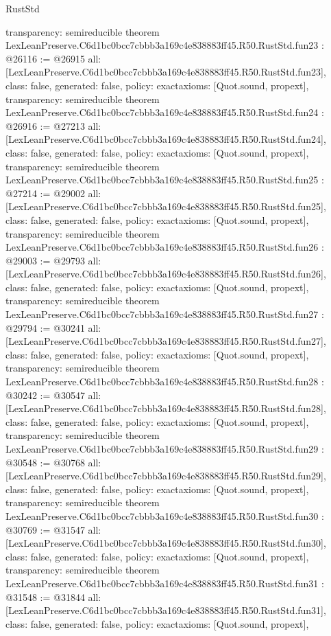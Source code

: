\begin{lexlean}{RustStd}
\begin{coremodule}
{  transparency: semireducible
}
theorem LexLeanPreserve.C6d1bc0bcc7cbbb3a169c4e838883ff45.R50.RustStd.fun23 : @26116 := @26915 {
  all: [LexLeanPreserve.C6d1bc0bcc7cbbb3a169c4e838883ff45.R50.RustStd.fun23],
  class: false,
  generated: false,
  policy: exact{axioms: [Quot.sound, propext]},
  transparency: semireducible
}
theorem LexLeanPreserve.C6d1bc0bcc7cbbb3a169c4e838883ff45.R50.RustStd.fun24 : @26916 := @27213 {
  all: [LexLeanPreserve.C6d1bc0bcc7cbbb3a169c4e838883ff45.R50.RustStd.fun24],
  class: false,
  generated: false,
  policy: exact{axioms: [Quot.sound, propext]},
  transparency: semireducible
}
theorem LexLeanPreserve.C6d1bc0bcc7cbbb3a169c4e838883ff45.R50.RustStd.fun25 : @27214 := @29002 {
  all: [LexLeanPreserve.C6d1bc0bcc7cbbb3a169c4e838883ff45.R50.RustStd.fun25],
  class: false,
  generated: false,
  policy: exact{axioms: [Quot.sound, propext]},
  transparency: semireducible
}
theorem LexLeanPreserve.C6d1bc0bcc7cbbb3a169c4e838883ff45.R50.RustStd.fun26 : @29003 := @29793 {
  all: [LexLeanPreserve.C6d1bc0bcc7cbbb3a169c4e838883ff45.R50.RustStd.fun26],
  class: false,
  generated: false,
  policy: exact{axioms: [Quot.sound, propext]},
  transparency: semireducible
}
theorem LexLeanPreserve.C6d1bc0bcc7cbbb3a169c4e838883ff45.R50.RustStd.fun27 : @29794 := @30241 {
  all: [LexLeanPreserve.C6d1bc0bcc7cbbb3a169c4e838883ff45.R50.RustStd.fun27],
  class: false,
  generated: false,
  policy: exact{axioms: [Quot.sound, propext]},
  transparency: semireducible
}
theorem LexLeanPreserve.C6d1bc0bcc7cbbb3a169c4e838883ff45.R50.RustStd.fun28 : @30242 := @30547 {
  all: [LexLeanPreserve.C6d1bc0bcc7cbbb3a169c4e838883ff45.R50.RustStd.fun28],
  class: false,
  generated: false,
  policy: exact{axioms: [Quot.sound, propext]},
  transparency: semireducible
}
theorem LexLeanPreserve.C6d1bc0bcc7cbbb3a169c4e838883ff45.R50.RustStd.fun29 : @30548 := @30768 {
  all: [LexLeanPreserve.C6d1bc0bcc7cbbb3a169c4e838883ff45.R50.RustStd.fun29],
  class: false,
  generated: false,
  policy: exact{axioms: [Quot.sound, propext]},
  transparency: semireducible
}
theorem LexLeanPreserve.C6d1bc0bcc7cbbb3a169c4e838883ff45.R50.RustStd.fun30 : @30769 := @31547 {
  all: [LexLeanPreserve.C6d1bc0bcc7cbbb3a169c4e838883ff45.R50.RustStd.fun30],
  class: false,
  generated: false,
  policy: exact{axioms: [Quot.sound, propext]},
  transparency: semireducible
}
theorem LexLeanPreserve.C6d1bc0bcc7cbbb3a169c4e838883ff45.R50.RustStd.fun31 : @31548 := @31844 {
  all: [LexLeanPreserve.C6d1bc0bcc7cbbb3a169c4e838883ff45.R50.RustStd.fun31],
  class: false,
  generated: false,
  policy: exact{axioms: [Quot.sound, propext]},
}
\end{coremodule}
\end{lexlean}
